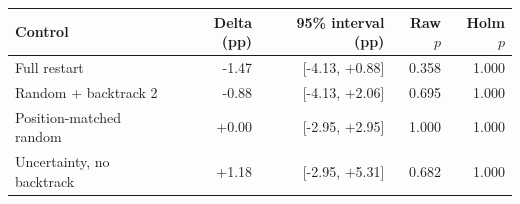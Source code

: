 \begin{tabular}{@{}lrrrr@{}}
\toprule
Control & Delta (pp) & 95\% interval (pp) & Raw $p$ & Holm $p$ \\
\midrule
Full restart & -1.47 & [-4.13, +0.88] & 0.358 & 1.000 \\
Random + backtrack 2 & -0.88 & [-4.13, +2.06] & 0.695 & 1.000 \\
Position-matched random & +0.00 & [-2.95, +2.95] & 1.000 & 1.000 \\
Uncertainty, no backtrack & +1.18 & [-2.95, +5.31] & 0.682 & 1.000 \\
\bottomrule
\end{tabular}
